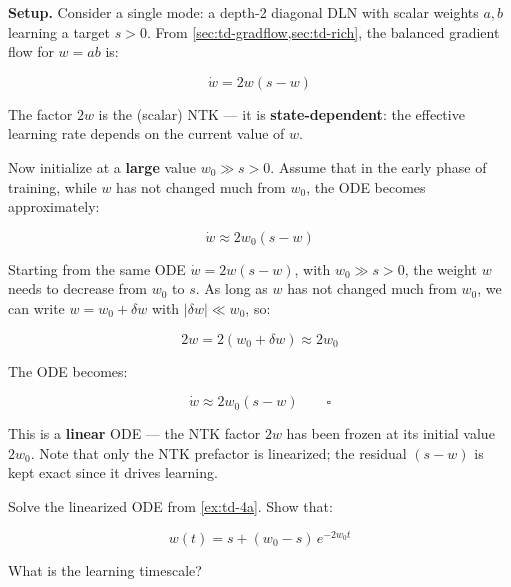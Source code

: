 \documentclass[11pt]{article}
\begin{document}
\textbf{Setup.} Consider a single mode: a depth-2 diagonal
DLN with scalar weights \(a, b\) learning a target \(s > 0\). From
\cref{sec:td-gradflow,sec:td-rich}, the balanced gradient flow for \(w = ab\) is:

\[\dot{w} = 2w(s - w)\]

The factor \(2w\) is the (scalar) NTK --- it is
\textbf{state-dependent}: the effective learning rate depends on the
current value of \(w\).

\begin{exercise}
\label{ex:td-4a}
Now initialize at a \textbf{large} value \(w_0 \gg s > 0\). Assume that in
the early phase of training, while \(w\) has not changed much from
\(w_0\), the ODE becomes approximately:

\[\dot{w} \approx 2w_0(s - w)\]
\end{exercise}

\begin{solution}[ex:td-4a]
Starting from the same ODE \(\dot{w} = 2w(s - w)\), with
\(w_0 \gg s > 0\), the weight \(w\) needs to decrease from \(w_0\) to
\(s\). As long as \(w\) has not changed much from \(w_0\), we can write
\(w = w_0 + \delta w\) with \(|\delta w| \ll w_0\), so:

\[2w = 2(w_0 + \delta w) \approx 2w_0\]

The ODE becomes:

\[\dot{w} \approx 2w_0(s - w) \qquad \square\]

This is a \textbf{linear} ODE --- the NTK factor \(2w\) has been frozen
at its initial value \(2w_0\). Note that only the NTK prefactor is
linearized; the residual \((s - w)\) is kept exact since it drives
learning.
\end{solution}

\begin{exercise}
\label{ex:td-4b}
Solve the linearized ODE from \cref{ex:td-4a}. Show that:

\[w(t) = s + (w_0 - s)\,e^{-2w_0 t}\]

What is the learning timescale?
\end{exercise}
\end{document}
